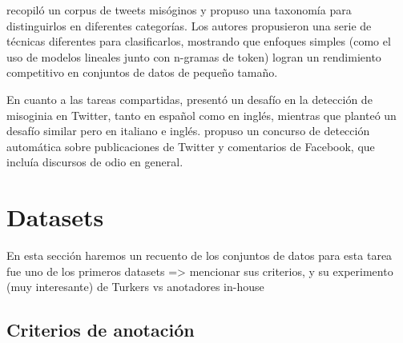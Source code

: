 \citet{anzovino2018automatic} recopiló un corpus de tweets misóginos y propuso una taxonomía para distinguirlos en diferentes categorías. Los autores propusieron una serie de técnicas diferentes para clasificarlos, mostrando que enfoques simples (como el uso de modelos lineales junto con n-gramas de token) logran un rendimiento competitivo en conjuntos de datos de pequeño tamaño.

En cuanto a las tareas compartidas, \citet{fersini2018overview} presentó un desafío en la detección de misoginia en Twitter, tanto en español como en inglés, mientras que \citet{fersini2018evalitaoverview} planteó un desafío similar pero en italiano e inglés. \citet{bosco2018overview} propuso un concurso de detección automática sobre publicaciones de Twitter y comentarios de Facebook, que incluía discursos de odio en general.


\section{Datasets}

En esta sección haremos un recuento de los conjuntos de datos para esta tarea
\citet{nobata2016abusive} fue uno de los primeros datasets => mencionar sus criterios, y su experimento (muy interesante) de Turkers vs anotadores in-house

\citet{gao2018detecting}

\subsection{Criterios de anotación}

